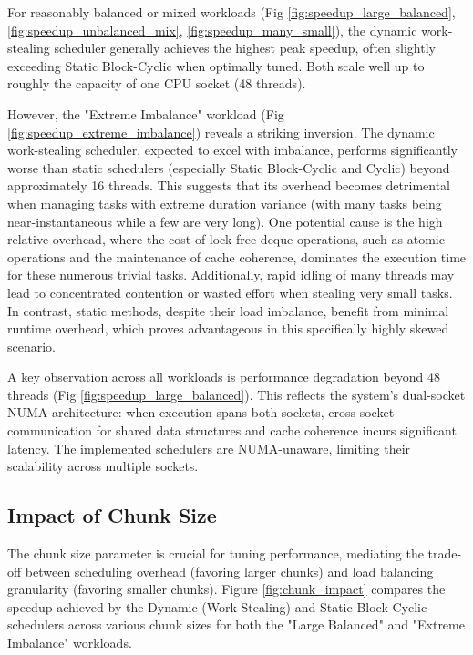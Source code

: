 \documentclass[10pt]{article}
\begin{document}
For reasonably balanced or mixed workloads (Fig \ref{fig:speedup_large_balanced}, \ref{fig:speedup_unbalanced_mix}, \ref{fig:speedup_many_small}), the dynamic work-stealing scheduler generally achieves the highest peak speedup, often slightly exceeding Static Block-Cyclic when optimally tuned. Both scale well up to roughly the capacity of one CPU socket (48 threads).

However, the "Extreme Imbalance" workload (Fig \ref{fig:speedup_extreme_imbalance}) reveals a striking inversion. The dynamic work-stealing scheduler, expected to excel with imbalance, performs significantly worse than static schedulers (especially Static Block-Cyclic and Cyclic) beyond approximately 16 threads. This suggests that its overhead becomes detrimental when managing tasks with extreme duration variance (with many tasks being near-instantaneous while a few are very long). One potential cause is the high relative overhead, where the cost of lock-free deque operations, such as atomic operations and the maintenance of cache coherence, dominates the execution time for these numerous trivial tasks. Additionally, rapid idling of many threads may lead to concentrated contention or wasted effort when stealing very small tasks. In contrast, static methods, despite their load imbalance, benefit from minimal runtime overhead, which proves advantageous in this specifically highly skewed scenario.

A key observation across all workloads is performance degradation beyond 48 threads (Fig \ref{fig:speedup_large_balanced}). This reflects the system's dual-socket NUMA architecture: when execution spans both sockets, cross-socket communication for shared data structures and cache coherence incurs significant latency. The implemented schedulers are NUMA-unaware, limiting their scalability across multiple sockets.

\subsection{Impact of Chunk Size}
The chunk size parameter is crucial for tuning performance, mediating the trade-off between scheduling overhead (favoring larger chunks) and load balancing granularity (favoring smaller chunks). Figure \ref{fig:chunk_impact} compares the speedup achieved by the Dynamic (Work-Stealing) and Static Block-Cyclic schedulers across various chunk sizes for both the "Large Balanced" and "Extreme Imbalance" workloads.
\end{document}
